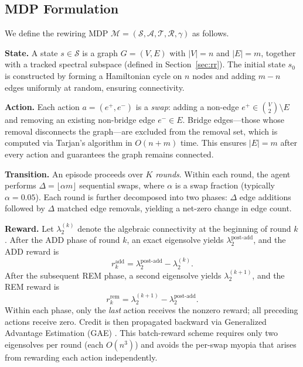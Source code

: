 \documentclass{article}
\begin{document}
\subsection{MDP Formulation}

We define the rewiring MDP $\mathcal{M} = (\mathcal{S}, \mathcal{A}, \mathcal{T}, \mathcal{R}, \gamma)$ as follows.

\textbf{State.} A state $s \in \mathcal{S}$ is a graph $G = (V, E)$ with $|V| = n$ and $|E| = m$, together with a tracked spectral subspace (defined in Section~\ref{sec:rr}). The initial state $s_0$ is constructed by forming a Hamiltonian cycle on $n$ nodes and adding $m - n$ edges uniformly at random, ensuring connectivity.

\textbf{Action.} Each action $a = (e^+, e^-)$ is a \emph{swap}: adding a non-edge $e^+ \in \binom{V}{2} \setminus E$ and removing an existing non-bridge edge $e^- \in E$. Bridge edges—those whose removal disconnects the graph—are excluded from the removal set, which is computed via Tarjan's algorithm in $O(n + m)$ time. This ensures $|E| = m$ after every action and guarantees the graph remains connected.

\textbf{Transition.} An episode proceeds over $K$ \emph{rounds}. Within each round, the agent performs $\Delta = \lfloor \alpha m \rfloor$ sequential swaps, where $\alpha$ is a swap fraction (typically $\alpha = 0.05$). Each round is further decomposed into two phases: $\Delta$ edge additions followed by $\Delta$ matched edge removals, yielding a net-zero change in edge count.

\textbf{Reward.} Let $\lambda_2^{(k)}$ denote the algebraic connectivity at the beginning of round $k$. After the ADD phase of round $k$, an exact eigensolve yields $\lambda_2^{\text{post-add}}$, and the ADD reward is
\begin{equation}\label{eq:reward_add}
    r_k^{\text{add}} = \lambda_2^{\text{post-add}} - \lambda_2^{(k)}.
\end{equation}
After the subsequent REM phase, a second eigensolve yields $\lambda_2^{(k+1)}$, and the REM reward is
\begin{equation}\label{eq:reward_rem}
    r_k^{\text{rem}} = \lambda_2^{(k+1)} - \lambda_2^{\text{post-add}}.
\end{equation}
Within each phase, only the \emph{last} action receives the nonzero reward; all preceding actions receive zero. Credit is then propagated backward via Generalized Advantage Estimation (GAE) \cite{schulman2015high}. This batch-reward scheme requires only two eigensolves per round (each $O(n^3)$) and avoids the per-swap myopia that arises from rewarding each action independently.
\end{document}
